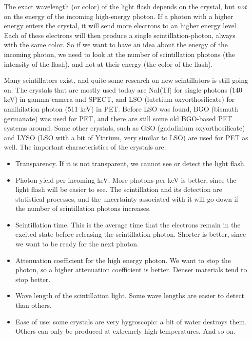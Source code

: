 The exact wavelength (or color) of the light flash depends on the crystal,
but {\em not} on the energy of the incoming high-energy photon. If a photon
with a higher energy enters the crystal, it will send more electrons to an
higher energy level. Each of these electrons will then produce a single
scintillation-photon, always with the same color. So if we want to have an
idea about the energy of the incoming photon, we need to look at the number
of scintillation photons (the intensity of the flash), and not at their
energy (the color of the flash).

Many scintillators exist, and quite some research on new scintillators
is still going on. The crystals that are mostly used today are NaI(Tl)
for single photons (140 keV) in gamma camera and SPECT, and LSO
(lutetium oxyorthosilicate) for annihilation photon (511 keV) in
PET. Before LSO was found, BGO (bismuth germanate) was used for PET,
and there are still some old BGO-based PET systems around. Some other
crystals, such as GSO (gadolinium oxyorthosilicate) and LYSO (LSO with
a bit of Yttrium, very similar to LSO) are used for PET as well. The
important characteristics of the crystals are:
\begin{itemize}
  \item Transparency. If it is not transparent, we cannot see or detect the
        light flash.
  \item Photon yield per incoming keV. More photons per keV is better, since
        the light flash will be easier to see. The scintillation and
        its detection are statistical processes, and the uncertainty
        associated with it will go down if the number of scintillation
        photons increases.
  \item Scintillation time. This is the average time that the electrons
        remain in the excited state before releasing the scintillation
        photon. Shorter is better, since we want to be ready for the next
        photon.
  \item Attenuation coefficient for the high energy photon. We want to stop
        the photon, so a higher attenuation coefficient is better. Denser
        materials tend to stop better.
  \item Wave length of the scintillation light. Some wave lengths are easier
        to detect than others.
  \item Ease of use: some crystals are very hygroscopic: a bit of water
        destroys them. Others can only be produced at extremely high
        temperatures. And so on.
\end{itemize}

